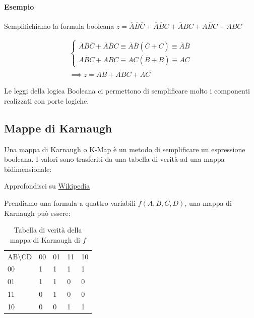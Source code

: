 \paragraph{Esempio}
Semplifichiamo la formula booleana $ z = \overbar{A}\overbar{B}\overbar{C} + \overbar{A}\overbar{B}C + \overbar{A}BC + A\overbar{B}C + ABC $

\begin{align}
\begin{cases}
\overbar{A}\overbar{B}\overbar{C} + \overbar{A}\overbar{B}C \equiv \overbar{A}\overbar{B}(\overbar{C}+C) \equiv \overbar{A}\overbar{B} \\ 
A\overbar{B}C + ABC \equiv AC(\overbar{B}+B) \equiv AC
\end{cases} \\
\implies z = \overbar{A}\overbar{B} + \overbar{A}BC + AC
\end{align}

Le leggi della logica Booleana ci permettono di semplificare molto i componenti realizzati con porte logiche.

\subsection{Mappe di Karnaugh}

Una mappa di Karnaugh o K-Map è un metodo di semplificare un espressione booleana. I valori sono trasferiti da una tabella di verità ad una mappa bidimensionale:

Approfondisci su \href{https://en.wikipedia.org/wiki/Karnaugh_map}{Wikipedia}

Prendiamo una formula a quattro variabili $ f(A,B,C,D) $, una mappa di Karnaugh può essere:
\begin{table}[H]
	\centering
	\caption{Tabella di verità della mappa di Karnaugh di $f$}
	\label{tab:karnaugh}
	\begin{tabular}{lllll}
		AB\textbackslash{}CD    & 00                     & 01                     & 11                     & 10                     \\ \cline{2-5} 
		\multicolumn{1}{l|}{00} & \multicolumn{1}{l|}{1} & \multicolumn{1}{l|}{1} & \multicolumn{1}{l|}{1} & \multicolumn{1}{l|}{1} \\ \cline{2-5} 
		\multicolumn{1}{l|}{01} & \multicolumn{1}{l|}{1} & \multicolumn{1}{l|}{1} & \multicolumn{1}{l|}{0} & \multicolumn{1}{l|}{0} \\ \cline{2-5} 
		\multicolumn{1}{l|}{11} & \multicolumn{1}{l|}{0} & \multicolumn{1}{l|}{1} & \multicolumn{1}{l|}{0} & \multicolumn{1}{l|}{0} \\ \cline{2-5} 
		\multicolumn{1}{l|}{10} & \multicolumn{1}{l|}{0} & \multicolumn{1}{l|}{0} & \multicolumn{1}{l|}{1} & \multicolumn{1}{l|}{1} \\ \cline{2-5} 
	\end{tabular}
\end{table}

